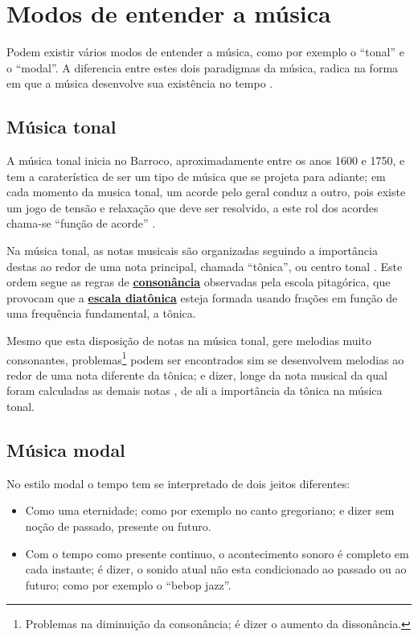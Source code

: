 
\section{Modos de entender a música}
\label{sec:ModosEntenderMusica}
Podem existir vários modos de entender a música, como por exemplo o ``tonal'' e o ``modal''.
A diferencia entre estes dois paradigmas da música, 
radica na forma em que a música desenvolve sua existência no tempo \cite[pp. 155]{arbones2012armonia}.


\subsection{Música tonal}
\label{sec:MusicaTonal}
A música tonal inicia no Barroco, aproximadamente entre os anos 1600 e 1750,
e tem a  caraterística de ser um tipo de  música que se projeta para adiante;
em cada momento da musica tonal, um acorde pelo geral conduz a outro,
pois existe um jogo de tensão e relaxação que deve ser resolvido,
a este rol dos acordes chama-se ``função de acorde'' \cite[pp. 155-156]{arbones2012armonia}.


Na música tonal, 
as notas musicais são organizadas seguindo a importância destas ao redor de uma nota  principal,
chamada ``tônica'', ou centro tonal \cite[pp. 27]{arbones2012armonia}.
Este ordem segue as regras de \hyperref[ref:paginadiatonicanumerica]{\textbf{consonância}} observadas pela escola pitagórica,
que provocam que a \hyperref[sec:pos:Diatonica]{\textbf{escala diatônica}} 
esteja formada usando frações em função de uma frequência fundamental, a tônica.

Mesmo que esta disposição de notas na música tonal, gere melodias muito consonantes,
problemas\footnote{Problemas na diminuição da consonância; é dizer o aumento da dissonância.} 
podem ser encontrados sim se desenvolvem melodias ao redor de uma nota diferente da tônica;
e dizer, longe da nota musical da qual foram calculadas as demais notas \cite[pp. 28]{arbones2012armonia},
de ali a importância da tônica na música tonal.




\subsection{Música modal}
\label{sec:MusicaAtonal}

No estilo modal o tempo tem se interpretado de dois jeitos diferentes:
\begin{itemize}
\item Como uma eternidade; como por exemplo no canto gregoriano; e dizer 
sem noção de passado, presente ou futuro.
\item Com o tempo como presente continuo, 
o acontecimento sonoro é completo em cada instante; é dizer,
 o sonido atual não esta condicionado ao passado ou ao futuro;
como por exemplo o ``bebop jazz''\cite[pp. 156]{arbones2012armonia}.
\end{itemize}



